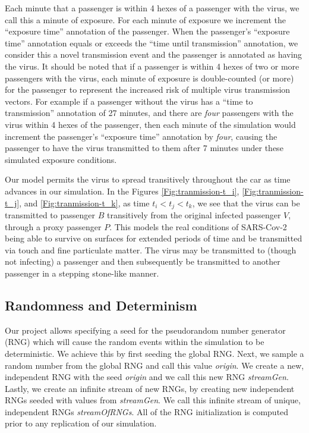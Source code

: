 \documentclass[12pt]{article}
\begin{document}
Each minute that a passenger is within 4 hexes of a passenger with the virus, we call this a minute of exposure.
For each minute of exposure we increment the ``exposure time'' annotation of the passenger.
When the passenger's ``exposure time'' annotation equals or exceeds the ``time until transmission'' annotation, we consider this a novel transmission event and the passenger is annotated as having the virus.
It should be noted that if a passenger is within 4 hexes of two or more passengers with the virus, each minute of exposure is double-counted (or more) for the passenger to represent the increased risk of multiple virus transmission vectors.
For example if a passenger without the virus has a ``time to transmission'' annotation of 27 minutes, and there are \emph{four} passengers with the virus within 4 hexes of the passenger, then each minute of the simulation would increment the passenger's ``exposure time'' annotation by \emph{four}, causing the passenger to have the virus transmitted to them after 7 minutes under these simulated exposure conditions.

Our model permits the virus to spread transitively throughout the car as time advances in our simulation.
In the Figures \ref{Fig:tranmission-t_i}, \ref{Fig:tranmission-t_j}, and \ref{Fig:tranmission-t_k}, as time $t_i < t_j < t_k$, we see that the virus can be transmitted to passenger $B$ transitively from the original infected passenger $V$, through a proxy passenger $P$.
This models the real conditions of SARS-Cov-2 being able to survive on surfaces for extended periods of time and be transmitted via touch and fine particulate matter.
The virus may be transmitted to (though not infecting) a passenger and then subsequently be transmitted to another passenger in a stepping stone-like manner. 

\subsection{Randomness and Determinism}

Our project allows specifying a seed for the pseudorandom number generator (RNG) which will cause the random events within the simulation to be deterministic.
We achieve this by first seeding the global RNG.
Next, we sample a random number from the global RNG and call this value \emph{origin}.
We create a new, independent RNG with the seed \emph{origin} and we call this new RNG \emph{streamGen}.
Lastly, we create an infinite stream of new RNGs, by creating new independent RNGs seeded with values from \emph{streamGen}. 
We call this infinite stream of unique, independent RNGs \emph{streamOfRNGs}.
All of the RNG initialization is computed prior to any replication of our simulation.
\end{document}
